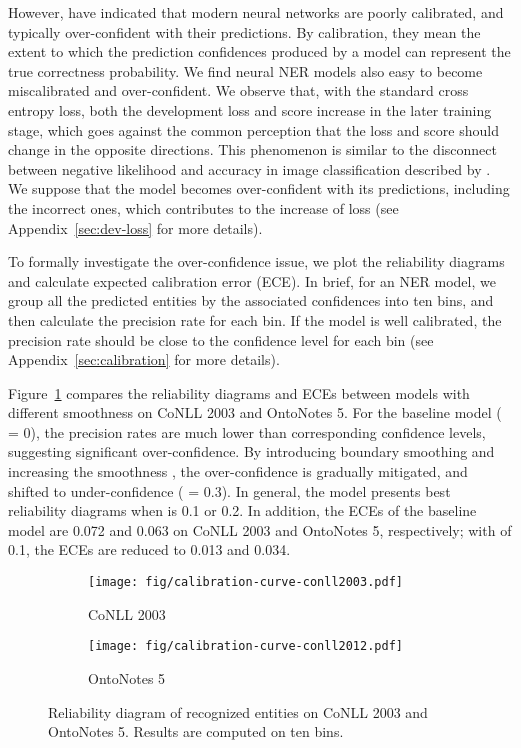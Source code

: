 \documentclass[11pt]{article}
\begin{document}
However, \citet{guo2017calibration} have indicated that modern neural networks are poorly calibrated, and typically over-confident with their predictions. By calibration, they mean the extent to which the prediction confidences produced by a model can represent the true correctness probability. We find neural NER models also easy to become miscalibrated and over-confident. We observe that, with the standard cross entropy loss, both the development loss and  score increase in the later training stage, which goes against the common perception that the loss and  score should change in the opposite directions. This phenomenon is similar to the disconnect between negative likelihood and accuracy in image classification described by \citet{guo2017calibration}. We suppose that the model becomes over-confident with its predictions, including the incorrect ones, which contributes to the increase of loss (see Appendix~\ref{sec:dev-loss} for more details). 

To formally investigate the over-confidence issue, we plot the reliability diagrams and calculate expected calibration error (ECE). In brief, for an NER model, we group all the predicted entities by the associated confidences into ten bins, and then calculate the precision rate for each bin. If the model is well calibrated, the precision rate should be close to the confidence level for each bin (see Appendix~\ref{sec:calibration} for more details). 

Figure~\ref{fig:calibration} compares the reliability diagrams and ECEs between models with different smoothness  on CoNLL 2003 and OntoNotes 5. For the baseline model ( = 0), the precision rates are much lower than corresponding confidence levels, suggesting significant over-confidence. By introducing boundary smoothing and increasing the smoothness , the over-confidence is gradually mitigated, and shifted to under-confidence ( = 0.3). In general, the model presents best reliability diagrams when  is 0.1 or 0.2. In addition, the ECEs of the baseline model are 0.072 and 0.063 on CoNLL 2003 and OntoNotes 5, respectively; with  of 0.1, the ECEs are reduced to 0.013 and 0.034. 


\begin{figure}[t]
    \centering
    \begin{subfigure}{\columnwidth}
    \centering
    \texttt{[image: fig/calibration-curve-conll2003.pdf]}
    \caption{CoNLL 2003}
    \end{subfigure}
    \begin{subfigure}{\columnwidth}
    \centering
    \texttt{[image: fig/calibration-curve-conll2012.pdf]}
    \caption{OntoNotes 5}
    \end{subfigure}
    \caption{Reliability diagram of recognized entities on CoNLL 2003 and OntoNotes 5. Results are computed on ten bins.}
    \label{fig:calibration}
\end{figure}
\end{document}
